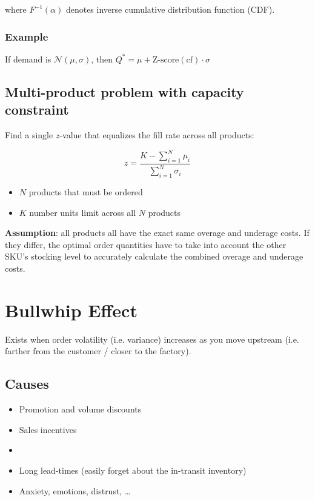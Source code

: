 \documentclass[11pt]{article}
\begin{document}
where $F^{-1}(\alpha)$ denotes inverse cumulative distribution function (CDF).

\subsubsection{Example}

If demand is $\mathcal{N}(\mu, \sigma)$, then $Q^* = \mu + \text{Z-score}(\text{cf}) \cdot \sigma$

\subsection{Multi-product problem with capacity constraint}

Find a single $z$-value that equalizes the fill rate across all products:

\begin{equation}
    z = \frac{K - \sum_{i = 1}^{N} \mu_i}{\sum_{i = 1}^{N} \sigma_i}
\end{equation}

\begin{itemize}
    \item $N$ products that must be ordered
    \item $K$ number units limit across all $N$ products
\end{itemize}

\textbf{Assumption}: all products all have the exact same overage and underage costs. If they differ, the optimal order
quantities have to take into account the other SKU's stocking level to accurately calculate the combined overage and
underage costs.

\section{Bullwhip Effect}

Exists when order volatility (i.e. variance) increases as you move upstream (i.e. farther from the customer / closer to the factory).

\subsection{Causes}

\begin{itemize}
    \item Promotion and volume discounts
    \item Sales incentives
    \item {}
    \item Long lead-times (easily forget about the in-transit inventory)
    \item Anxiety, emotions, distrust, \dots
\end{itemize}
\end{document}
